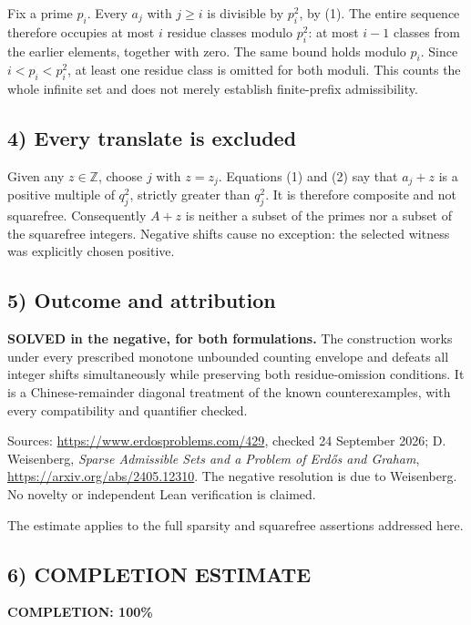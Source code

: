 Fix a prime $p_i$. Every $a_j$ with $j\ge i$ is divisible by $p_i^2$, by (1). The entire sequence therefore occupies at most $i$ residue classes modulo $p_i^2$: at most $i-1$ classes from the earlier elements, together with zero. The same bound holds modulo $p_i$. Since $i<p_i<p_i^2$, at least one residue class is omitted for both moduli. This counts the whole infinite set and does not merely establish finite-prefix admissibility.

\subsection*{4) Every translate is excluded}
Given any $z\in\mathbb Z$, choose $j$ with $z=z_j$. Equations (1) and (2) say that $a_j+z$ is a positive multiple of $q_j^2$, strictly greater than $q_j^2$. It is therefore composite and not squarefree. Consequently $A+z$ is neither a subset of the primes nor a subset of the squarefree integers. Negative shifts cause no exception: the selected witness was explicitly chosen positive.

\subsection*{5) Outcome and attribution}
\textbf{SOLVED in the negative, for both formulations.} The construction works under every prescribed monotone unbounded counting envelope and defeats all integer shifts simultaneously while preserving both residue-omission conditions. It is a Chinese-remainder diagonal treatment of the known counterexamples, with every compatibility and quantifier checked.

Sources: \url{https://www.erdosproblems.com/429}, checked 24 September 2026; D. Weisenberg, \emph{Sparse Admissible Sets and a Problem of Erd\H{o}s and Graham}, \url{https://arxiv.org/abs/2405.12310}. The negative resolution is due to Weisenberg. No novelty or independent Lean verification is claimed.

The estimate applies to the full sparsity and squarefree assertions addressed here.
\subsection*{6) COMPLETION ESTIMATE}
\textbf{COMPLETION: 100\%}
